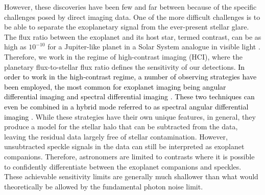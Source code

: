 \documentclass{aa}
\newcommand{\newchange}[1]{\textcolor{black}{#1}}
\begin{document}
However, these discoveries have been   few and far between because of the specific challenges posed by direct imaging data.
One of the more difficult challenges is to be able to separate the exoplanetary signal from the ever-present stellar glare.
The flux ratio between the exoplanet and its host star, termed contrast, can be as high as $10^{-10}$ for a Jupiter-like planet in a Solar System analogue in visible light \citep[e.g.][]{2023Galicher}.
Therefore, we work in the regime of high-contrast imaging (HCI), where the planetary flux-to-stellar flux ratio defines the sensitivity of our detections.
\newchange{In order to work in the high-contrast regime, a number of observing strategies have been employed, the most common for exoplanet imaging being angular differential imaging \citep[ADI;][]{Liu2004,2006MaroisADI} and spectral differential imaging \citep[SDI;][]{2002SparksSDI}. These two techniques can even be combined in a hybrid mode referred to as spectral angular differential imaging \citep[SADI; e.g.][]{2019ChristiaensPDS70}.}
While these strategies have their own unique features, in general, they produce a model for the stellar halo that can be subtracted from the data, leaving the residual data largely free of stellar contamination.
However, unsubtracted speckle signals in the data can still be interpreted as exoplanet companions.
Therefore, astronomers are limited to contrasts where it is possible to confidently differentiate between the exoplanet companions and speckles. These achievable sensitivity limits are generally much shallower than what would theoretically be allowed by the fundamental photon noise limit.
\end{document}
